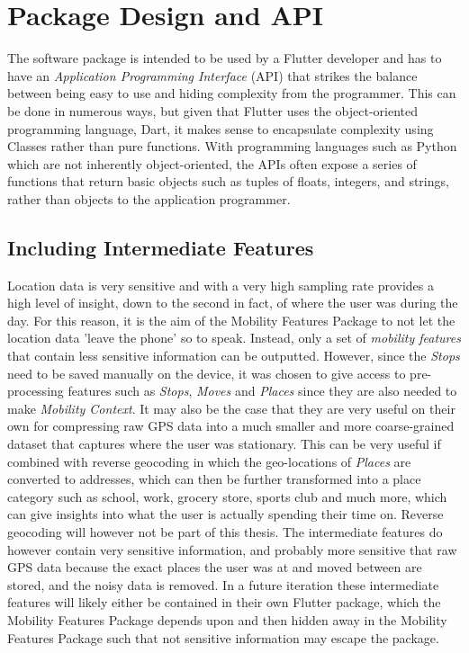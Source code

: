 \section{Package Design and API}
The software package is intended to be used by a Flutter developer and has to have an \textit{Application Programming Interface} (API) that strikes the balance between being easy to use and hiding complexity from the programmer. This can be done in numerous ways, but given that Flutter uses the object-oriented programming language, Dart, it makes sense to encapsulate complexity using Classes rather than pure functions. With programming languages such as Python which are not inherently object-oriented, the APIs often expose a series of functions that return basic objects such as tuples of floats, integers, and strings, rather than objects to the application programmer.

\subsection{Including Intermediate Features}
Location data is very sensitive and with a very high sampling rate provides a high level of insight, down to the second in fact, of where the user was during the day. For this reason, it is the aim of the Mobility Features Package to not let the location data 'leave the phone' so to speak. Instead, only a set of \textit{mobility features} that contain less sensitive information can be outputted. However, since the \textit{Stops} need to be saved manually on the device, it was chosen to give access to pre-processing features such as \textit{Stops}, \textit{Moves} and \textit{Places} since they are also needed to make \textit{Mobility Context}. It may also be the case that they are very useful on their own for compressing raw GPS data into a much smaller and more coarse-grained dataset that captures where the user was stationary. This can be very useful if combined with reverse geocoding in which the geo-locations of \textit{Places} are converted to addresses, which can then be further transformed into a place category such as school, work, grocery store, sports club and much more, which can give insights into what the user is actually spending their time on. Reverse geocoding will however not be part of this thesis. The intermediate features do however contain very sensitive information, and probably more sensitive that raw GPS data because the exact places the user was at and moved between are stored, and the noisy data is removed. In a future iteration these intermediate features will likely either be contained in their own Flutter package, which the Mobility Features Package depends upon and then hidden away in the Mobility Features Package such that not sensitive information may escape the package.

